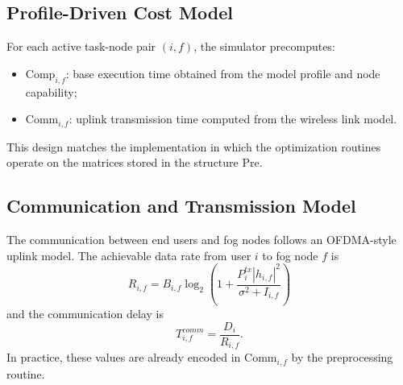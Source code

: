 \subsection{Profile-Driven Cost Model}
For each active task-node pair $(i,f)$, the simulator precomputes:
\begin{itemize}
    \item $\mathrm{Comp}_{i,f}$: base execution time obtained from the model profile and node capability;
    \item $\mathrm{Comm}_{i,f}$: uplink transmission time computed from the wireless link model.
\end{itemize}
This design matches the implementation in which the optimization routines operate on the matrices stored in the structure $\mathrm{Pre}$.

\subsection{Communication and Transmission Model}
The communication between end users and fog nodes follows an OFDMA-style uplink model. The achievable data rate from user $i$ to fog node $f$ is
\begin{equation}
    R_{i,f} = B_{i,f} \log_2 \left( 1 + \frac{P_i^{tx} |h_{i,f}|^2}{\sigma^2 + I_{i,f}} \right)
\end{equation}
and the communication delay is
\begin{equation}
    T_{i,f}^{comm} = \frac{D_i}{R_{i,f}}.
\end{equation}
In practice, these values are already encoded in $\mathrm{Comm}_{i,f}$ by the preprocessing routine.

